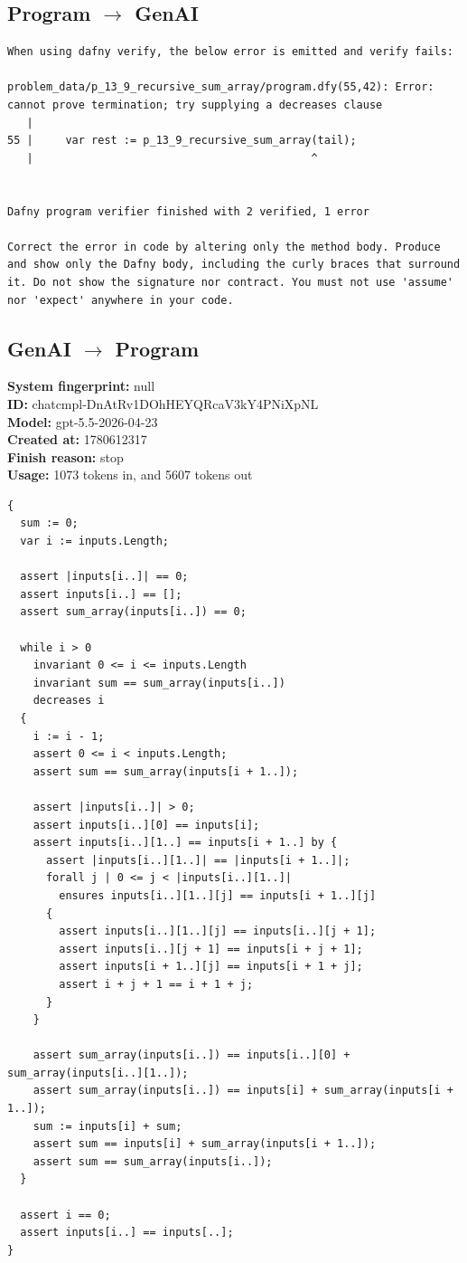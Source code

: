 \documentclass{article}
\begin{document}
\subsection*{Program $\rightarrow$ GenAI}
\begin{lstlisting}
When using dafny verify, the below error is emitted and verify fails:

problem_data/p_13_9_recursive_sum_array/program.dfy(55,42): Error: cannot prove termination; try supplying a decreases clause
   |
55 |     var rest := p_13_9_recursive_sum_array(tail);
   |                                           ^


Dafny program verifier finished with 2 verified, 1 error

Correct the error in code by altering only the method body. Produce and show only the Dafny body, including the curly braces that surround it. Do not show the signature nor contract. You must not use 'assume' nor 'expect' anywhere in your code.
\end{lstlisting}
\subsection*{GenAI $\rightarrow$ Program}
\textbf{System fingerprint: }null
\\\textbf{ID: }chatcmpl-DnAtRv1DOhHEYQRcaV3kY4PNiXpNL
\\\textbf{Model: }gpt-5.5-2026-04-23
\\\textbf{Created at: }1780612317
\\\textbf{Finish reason: }stop
\\\textbf{Usage: }1073 tokens in, and 5607 tokens out
\begin{lstlisting}
{
  sum := 0;
  var i := inputs.Length;

  assert |inputs[i..]| == 0;
  assert inputs[i..] == [];
  assert sum_array(inputs[i..]) == 0;

  while i > 0
    invariant 0 <= i <= inputs.Length
    invariant sum == sum_array(inputs[i..])
    decreases i
  {
    i := i - 1;
    assert 0 <= i < inputs.Length;
    assert sum == sum_array(inputs[i + 1..]);

    assert |inputs[i..]| > 0;
    assert inputs[i..][0] == inputs[i];
    assert inputs[i..][1..] == inputs[i + 1..] by {
      assert |inputs[i..][1..]| == |inputs[i + 1..]|;
      forall j | 0 <= j < |inputs[i..][1..]|
        ensures inputs[i..][1..][j] == inputs[i + 1..][j]
      {
        assert inputs[i..][1..][j] == inputs[i..][j + 1];
        assert inputs[i..][j + 1] == inputs[i + j + 1];
        assert inputs[i + 1..][j] == inputs[i + 1 + j];
        assert i + j + 1 == i + 1 + j;
      }
    }

    assert sum_array(inputs[i..]) == inputs[i..][0] + sum_array(inputs[i..][1..]);
    assert sum_array(inputs[i..]) == inputs[i] + sum_array(inputs[i + 1..]);
    sum := inputs[i] + sum;
    assert sum == inputs[i] + sum_array(inputs[i + 1..]);
    assert sum == sum_array(inputs[i..]);
  }

  assert i == 0;
  assert inputs[i..] == inputs[..];
}
\end{lstlisting}
\end{document}

